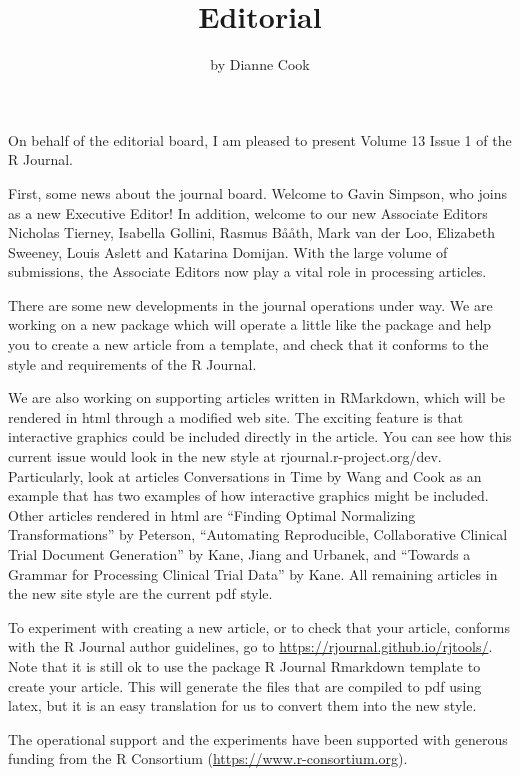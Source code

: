 \title{Editorial}
\author{by Dianne Cook}

\maketitle


On behalf of the editorial board, I am pleased to present Volume 13 Issue 1 of the R Journal.

First, some news about the journal board. Welcome to Gavin Simpson, who joins as a new Executive Editor! In addition, welcome to our new Associate Editors Nicholas Tierney, Isabella Gollini, Rasmus B\r{a}\r{a}th, Mark van der Loo, Elizabeth Sweeney, Louis Aslett and Katarina Domijan. With the large volume of submissions, the Associate Editors now play a vital role in processing articles.

There are some new developments in the journal operations under way. We are working on a new package  which will operate a little like the  package and help you to create a new article from a template, and check that it conforms to the style and requirements of the R Journal.

We are also working on supporting articles written in RMarkdown, which will be rendered in html through a modified  web site. The exciting feature is that interactive graphics could be included directly in the article. You can see how this current issue would look in the new style at rjournal.r-project.org/dev. Particularly, look at articles Conversations in Time by Wang and Cook as an example that has two examples of how interactive graphics might be included. Other articles rendered in html are ``Finding Optimal Normalizing Transformations'' by Peterson, ``Automating Reproducible, Collaborative
Clinical Trial Document Generation'' by Kane, Jiang and Urbanek, and ``Towards a Grammar for Processing Clinical Trial Data'' by Kane. All remaining articles in the new site style are the current pdf style.

To experiment with creating a new article, or to check that your article, conforms with the R Journal author guidelines, go to \url{https://rjournal.github.io/rjtools/}. Note that it is still ok to use the  package R Journal Rmarkdown template to create your article. This will generate the files that are compiled to pdf using latex, but it is an easy translation for us to convert them into the new style.

The operational support and the experiments have been supported with generous funding from the R Consortium (\url{https://www.r-consortium.org}).

